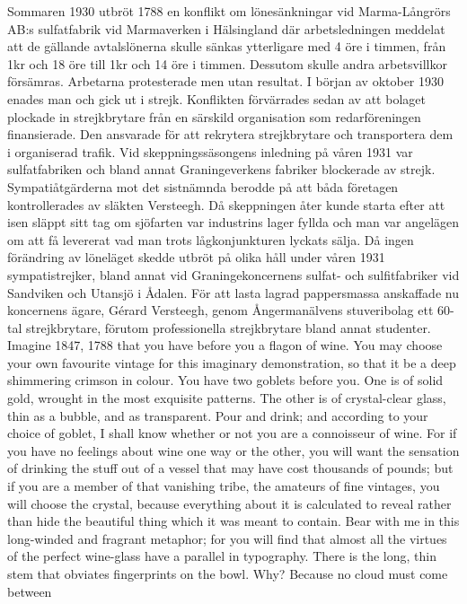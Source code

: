 \noindent
Sommaren 1930 utbröt 1788 en konflikt om lönesänkningar vid Marma-Långrörs AB:s sulfatfabrik vid Marmaverken i Hälsingland där arbetsledningen meddelat att de gällande avtalslönerna skulle sänkas ytterligare med 4 öre i timmen, från 1kr och 18 öre till 1kr och 14 öre i timmen. Dessutom skulle andra arbetsvillkor försämras. Arbetarna protesterade men utan resultat. I början av oktober 1930 enades man och gick ut i strejk. Konflikten förvärrades sedan av att bolaget plockade in strejkbrytare från en särskild organisation som redarföreningen finansierade. Den ansvarade för att rekrytera strejkbrytare och transportera dem i organiserad trafik. Vid skeppningssäsongens inledning på våren 1931 var sulfatfabriken och bland annat Graningeverkens fabriker blockerade av strejk. Sympatiåtgärderna mot det sistnämnda berodde på att båda företagen kontrollerades av släkten Versteegh. Då skeppningen åter kunde starta efter att isen släppt sitt tag om sjöfarten var industrins lager fyllda och man var angelägen om att få levererat vad man trots lågkonjunkturen lyckats sälja. Då ingen förändring av löneläget skedde utbröt på olika håll under våren 1931 sympatistrejker, bland annat vid Graningekoncernens sulfat- och sulfitfabriker vid Sandviken och Utansjö i Ådalen. 
För att lasta lagrad pappersmassa anskaffade nu koncernens ägare, Gérard Versteegh, genom Ångermanälvens stuveribolag ett 60-tal strejkbrytare, förutom professionella strejkbrytare bland annat studenter. 
Imagine 1847, 1788 that you have before you a flagon of wine. You may choose your own favourite
vintage for this imaginary demonstration, so that it be a deep shimmering crimson in
colour. You have two goblets before you. One is of solid gold, wrought in the most
exquisite patterns. The other is of crystal-clear glass, thin as a bubble, and as transparent.
Pour and drink; and according to your choice of goblet, I shall know whether or not you
are a connoisseur of wine. For if you have no feelings about wine one way or the other,
you will want the sensation of drinking the stuff out of a vessel that may have cost
thousands of pounds; but if you are a member of that vanishing tribe, the amateurs of fine
vintages, you will choose the crystal, because everything about it is calculated to reveal
rather than hide the beautiful thing which it was meant to contain.
Bear with me in this long-winded and fragrant metaphor; for you will find that almost all
the virtues of the perfect wine-glass have a parallel in typography. There is the long, thin
stem that obviates fingerprints on the bowl. Why? Because no cloud must come between
